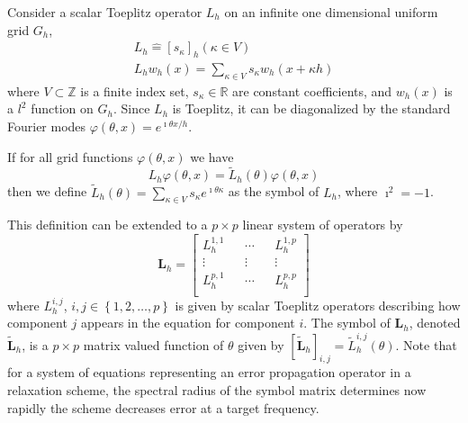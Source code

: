 Consider a scalar Toeplitz operator $L_h$ on an infinite one dimensional uniform grid $G_h$,
\begin{equation}
\begin{split}
L_h \mathrel{\hat{=}} \left[ s_\kappa \right]_h \left( \kappa \in V \right)\\
L_h w_h \left( x \right) = \sum_{\kappa \in V} s_\kappa w_h \left( x + \kappa h \right)
\end{split}
\end{equation}
where $V \subset \mathbb{Z}$ is a finite index set, $s_\kappa \in \mathbb{R}$ are constant coefficients, and $w_h \left( x \right)$ is a $l^2$ function on $G_h$.
Since $L_h$ is Toeplitz, it can be diagonalized by the standard Fourier modes $\varphi \left( \theta, x \right) = e^{\imath \theta x / h}$.

\begin{definition}[Symbol of $L_h$]\label{def:symbol}
If for all grid functions $\varphi \left( \theta, x \right)$ we have
\begin{equation}
L_h \varphi \left( \theta, x \right) = \tilde{L}_h \left( \theta \right) \varphi \left( \theta, x \right)
\end{equation}
then we define $\tilde{L}_h \left( \theta \right) = \sum_{\kappa \in V} s_\kappa e^{\imath \theta \kappa}$ as the symbol of $L_h$, where $\imath^2 = -1$.
\end{definition}

This definition can be extended to a $p \times p$ linear system of operators by
\begin{equation}
\mathbf{L}_h =
\begin{bmatrix}
    L_h^{1, 1} && \cdots && L_h^{1, p}        \\
    \vdots               && \vdots && \vdots  \\
    L_h^{p, 1} && \cdots && L_h^{p, p}        \\
\end{bmatrix}
\end{equation}
where $L_h^{i, j}$, $i, j \in \left\lbrace 1, 2, \dots, p \right\rbrace$ is given by scalar Toeplitz operators describing how component $j$ appears in the equation for component $i$.
The symbol of $\mathbf{L}_h$, denoted $\tilde{\mathbf{L}}_h$, is a $p \times p$ matrix valued function of $\theta$ given by $\left[ \tilde{\mathbf{L}}_h \right]_{i, j} = \tilde{L}_h^{i, j} \left( \theta \right)$.
Note that for a system of equations representing an error propagation operator in a relaxation scheme, the spectral radius of the symbol matrix determines now rapidly the scheme decreases error at a target frequency.

